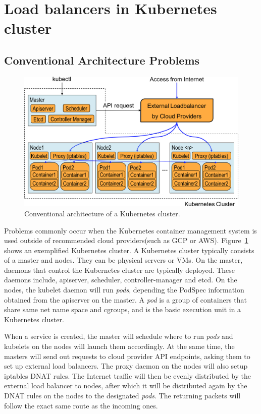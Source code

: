 \section{Load balancers in Kubernetes cluster}\label{Load balancers in Kubernetes cluster}

\subsection{Conventional Architecture Problems}

\begin{figure}
\includegraphics[width=\columnwidth]{Figs/K8sConventional}
\caption{Conventional architecture of a Kubernetes cluster.}
\label{fig:K8sConventional}
\end{figure}

Problems commonly occur when the Kubernetes container management system is used outside of recommended cloud providers(such as GCP or AWS).
Figure~\ref{fig:K8sConventional} shows an exemplified Kubernetes cluster.
A Kubernetes cluster typically consists of a master and nodes. They can be physical servers or VMs.
On the master, daemons that control the Kubernetes cluster are typically deployed. 
These daemons include, apiserver, scheduler, controller-manager and etcd. 
On the nodes, the kubelet daemon will run {\it pods}, depending the PodSpec information obtained from the apiserver on the master.
A {\em pod} is a group of containers that share same net name space and cgroups, 
and is the basic execution unit in a Kubernetes cluster.

When a service is created, the master will schedule where to run {\em pods} and kubelets on the nodes will launch them accordingly.
At the same time, the masters will send out requests to cloud provider API endpoints, asking them to set up external load balancers.
The proxy daemon on the nodes will also setup iptables DNAT\cite{MartinA.Brown2017} rules. 
The Internet traffic will then be evenly distributed by the external load balancer to nodes, 
after which it will be distributed again by the DNAT rules on the nodes to the designated {\em pods}. 
The returning packets will follow the exact same route as the incoming ones.

